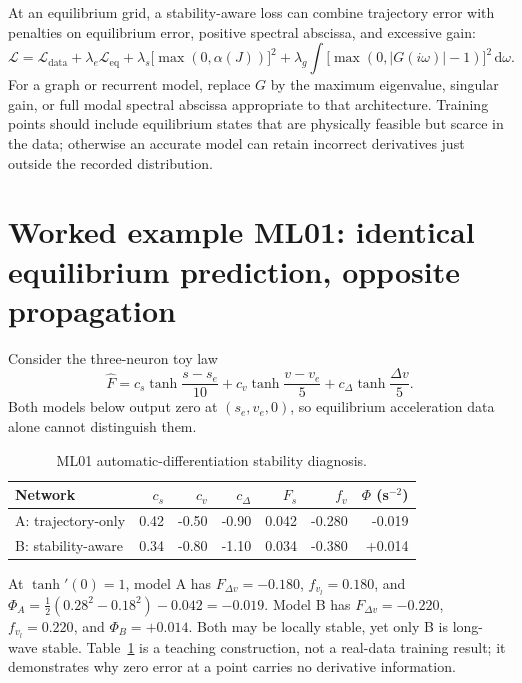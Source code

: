 \documentclass[11pt,a4paper,openany]{book}
\numberwithin{equation}{chapter}
\numberwithin{figure}{chapter}
\numberwithin{table}{chapter}
\newcommand{\dd}{\,\mathrm{d}}
\begin{document}
At an equilibrium grid, a stability-aware loss can combine trajectory error with penalties on equilibrium error, positive spectral abscissa, and excessive gain:
\begin{equation}
\mathcal L=\mathcal L_{\mathrm{data}}+\lambda_e\mathcal L_{\mathrm{eq}}
+\lambda_s\bigl[\max(0,\alpha(J))\bigr]^2
+\lambda_g\int\bigl[\max(0,|G(i\omega)|-1)\bigr]^2\dd\omega.
\end{equation}
For a graph or recurrent model, replace $G$ by the maximum eigenvalue, singular gain, or full modal spectral abscissa appropriate to that architecture. Training points should include equilibrium states that are physically feasible but scarce in the data; otherwise an accurate model can retain incorrect derivatives just outside the recorded distribution.

\section{Worked example ML01: identical equilibrium prediction, opposite propagation}
Consider the three-neuron toy law
\begin{equation}
\widehat F=c_s\tanh\frac{s-s_e}{10}+c_v\tanh\frac{v-v_e}{5}+c_\Delta\tanh\frac{\Delta v}{5}.
\end{equation}
Both models below output zero at $(s_e,v_e,0)$, so equilibrium acceleration data alone cannot distinguish them.
\begin{table}[htbp]\centering\caption{ML01 automatic-differentiation stability diagnosis.}\label{tab:ml01}
\begin{tabular}{lrrrrrr}\toprule
Network & $c_s$ & $c_v$ & $c_\Delta$ & $F_s$ & $f_v$ & $\Phi$ (s$^{-2}$)\\\midrule
A: trajectory-only & 0.42 & -0.50 & -0.90 & 0.042 & -0.280 & -0.019\\
B: stability-aware & 0.34 & -0.80 & -1.10 & 0.034 & -0.380 & +0.014\\\bottomrule
\end{tabular}\end{table}
At $\tanh'(0)=1$, model A has $F_{\Delta v}=-0.180$, $f_{v_l}=0.180$, and $\Phi_A=\tfrac12(0.28^2-0.18^2)-0.042=-0.019$. Model B has $F_{\Delta v}=-0.220$, $f_{v_l}=0.220$, and $\Phi_B=+0.014$. Both may be locally stable, yet only B is long-wave stable. Table~\ref{tab:ml01} is a teaching construction, not a real-data training result; it demonstrates why zero error at a point carries no derivative information.
\end{document}
